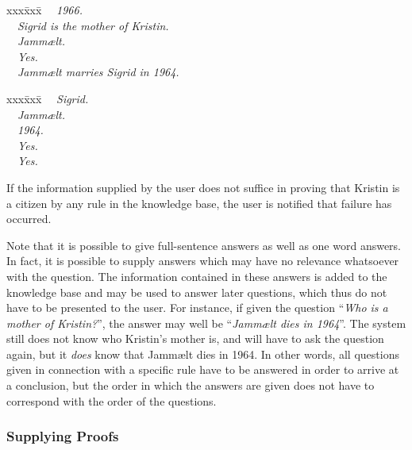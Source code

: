 \begin{tabbing}
  xxx\= xxx\= \kill
  \>\ \ {\sl 1966.}\\
  \>\ \ {\sl Sigrid is the mother
  of Kristin.}\\
  \>\ \ {\sl Jamm\ae lt.}\\
  \>\ \ {\sl Yes.}\\
  \>\ \ {\sl Jamm\ae lt
  marries Sigrid in 1964.}
\end{tabbing}

\begin{tabbing}
  xxx\= xxx\= \kill
  \>\ \ {\sl Sigrid.}\\
  \>\ \ {\sl Jamm\ae lt.}\\
  \>\ \ {\sl 1964.}\\
  \>\ \ {\sl Yes.}\\
  \>\ \ {\sl Yes.}
\end{tabbing}
If the information supplied by the user does not suffice in proving
that Kristin is a citizen by any rule in the knowledge base, the user
is notified that failure has occurred.

Note that it is possible to give full-sentence answers as well as one
word answers. In fact, it is possible to supply answers which may have
no relevance whatsoever with the question. The information contained
in these answers is added to the knowledge base and may be used to
answer later questions, which thus do not have to be presented to the
user.  For instance, if given the question ``{\em Who is a mother of
Kristin?\/}'', the answer may well be ``{\em Jamm\ae lt dies in
1964\/}''. The system still does not know who Kristin's mother is, and
will have to ask the question again, but it {\em does\/} know that
Jamm\ae lt dies in 1964.  In other words, all questions given in
connection with a specific rule have to be answered in order to arrive
at a conclusion, but the order in which the answers are given does not
have to correspond with the order of the questions.

\subsubsection{Supplying Proofs}

